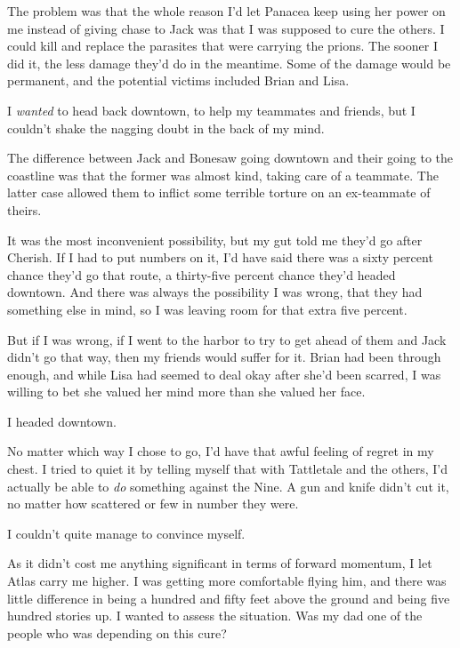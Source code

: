 The problem was that the whole reason I'd let Panacea keep using her power on me instead of giving chase to Jack was that I was supposed to cure the others.  I could kill and replace the parasites that were carrying the prions.  The sooner I did it, the less damage they'd do in the meantime.  Some of the damage would be permanent, and the potential victims included Brian and Lisa.



I \emph{wanted} to head back downtown, to help my teammates and friends, but I couldn't shake the nagging doubt in the back of my mind.



The difference between Jack and Bonesaw going downtown and their going to the coastline was that the former was almost kind, taking care of a teammate.  The latter case allowed them to inflict some terrible torture on an ex-teammate of theirs.



It was the most inconvenient possibility, but my gut told me they'd go after Cherish.  If I had to put numbers on it, I'd have said there was a sixty percent chance they'd go that route, a thirty-five percent chance they'd headed downtown.  And there was always the possibility I was wrong, that they had something else in mind, so I was leaving room for that extra five percent.



But if I was wrong, if I went to the harbor to try to get ahead of them and Jack didn't go that way, then my friends would suffer for it.  Brian had been through enough, and while Lisa had seemed to deal okay after she'd been scarred, I was willing to bet she valued her mind more than she valued her face.



I headed downtown.



No matter which way I chose to go, I'd have that awful feeling of regret in my chest.  I tried to quiet it by telling myself that with Tattletale and the others, I'd actually be able to \emph{do} something against the Nine.  A gun and knife didn't cut it, no matter how scattered or few in number they were.



I couldn't quite manage to convince myself.



As it didn't cost me anything significant in terms of forward momentum, I let Atlas carry me higher.  I was getting more comfortable flying him, and there was little difference in being a hundred and fifty feet above the ground and being five hundred stories up.  I wanted to assess the situation.  Was my dad one of the people who was depending on this cure?



